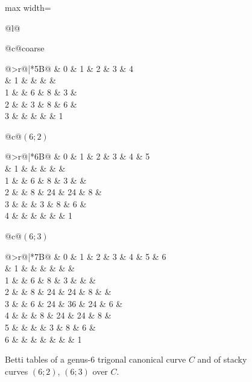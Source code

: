 \documentclass[11pt,reqno]{amsart}
\makeatletter
\theoremstyle{remark}
\newcommand{\cX}{\mathcal{X}}
\newcommand{\z}{\textendash}               %
\newcommand{\h}[1]{{\scriptsize #1}}       %
\newenvironment{betti}[1]
  {\begingroup\setlength{\tabcolsep}{1.5pt}%
      \renewcommand{\arraystretch}{.95}%
   \begin{tabular}[t]{@{}>{\scriptsize}r@{\hspace{5pt}}|*{#1}{B}@{}}}
  {\end{tabular}\endgroup}
\newcommand{\bettipanel}[2]{%
  \begin{tabular}[t]{@{}c@{}}\small #1\\[3pt] #2\end{tabular}}
\makeatother
\begin{document}

\begin{figure}
\centering
\begin{adjustbox}{max width=\linewidth}
\begin{tabular}{@{}l@{}}

\bettipanel{coarse}{%
\begin{betti}{5}
  & \h0 & \h1 & \h2 & \h3 & \h4 \\ \hline
0 & 1  & \z & \z & \z & \z \\
1 & \z & 6  & 8  & 3  & \z \\
2 & \z & 3  & 8  & 6  & \z \\
3 & \z & \z & \z & \z & 1
\end{betti}}%
\hspace{2.2em}%
\bettipanel{$(6;2)$}{%
\begin{betti}{6}
  & \h0 & \h1 & \h2 & \h3 & \h4 & \h5 \\ \hline
0 & 1  & \z & \z & \z & \z & \z \\
1 & \z & 6  & 8  & 3  & \z & \z \\
2 & \z & 8  & 24 & 24 & 8  & \z \\
3 & \z & \z & 3  & 8  & 6  & \z \\
4 & \z & \z & \z & \z & \z & 1
\end{betti}}%
\hspace{2.2em}%
\bettipanel{$(6;3)$}{%
\begin{betti}{7}
  & \h0 & \h1 & \h2 & \h3 & \h4 & \h5 & \h6 \\ \hline
0 & 1  & \z & \z & \z & \z & \z & \z \\
1 & \z & 6  & 8  & 3  & \z & \z & \z \\
2 & \z & 8  & 24 & 24 & 8  & \z & \z \\
3 & \z & 6  & 24 & 36 & 24 & 6  & \z \\
4 & \z & \z & 8  & 24 & 24 & 8  & \z \\
5 & \z & \z & \z & 3  & 8  & 6  & \z \\
6 & \z & \z & \z & \z & \z & \z & 1
\end{betti}}

\end{tabular}
\end{adjustbox}
\caption{Betti tables of a genus-$6$ trigonal canonical curve $C$ and of stacky curves $(6;2)$, $(6;3)$ over $C$.}\label{fig:betti}
\end{figure}
\end{document}
